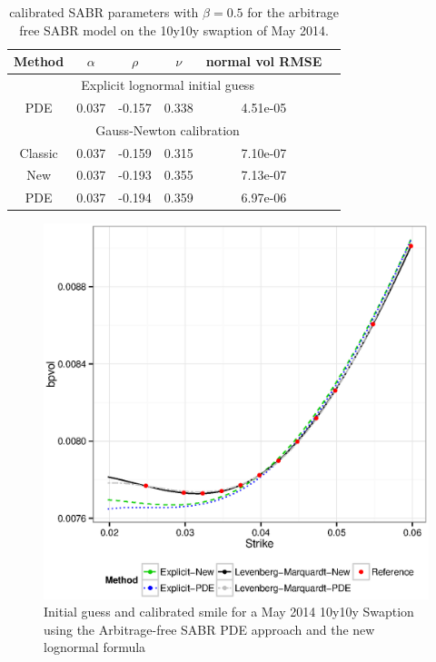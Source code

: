 \documentclass[]{rAMF2e}
\begin{document}
\begin{table}[hbp]
\begin{center}
\caption{\label{tbl:arbfree_sabr_fit}calibrated SABR parameters with $\beta=0.5$ for the arbitrage free SABR model on the 10y10y swaption of May 2014.}
\begin{tabular}{c c c c c c}
\hline
Method & $\alpha$ & $\rho$ &$\nu$ & normal vol RMSE \\
\hline
\multicolumn{5}{c}{Explicit lognormal initial guess}\\
\hline
PDE & 0.037 & -0.157 & 0.338 & 4.51e-05 \\
\hline
\multicolumn{5}{c}{Gauss-Newton calibration}\\
\hline
Classic & 0.037 & -0.159 & 0.315 & 7.10e-07\\
New & 0.037 & -0.193 & 0.355 & 7.13e-07\\
PDE & 0.037 & -0.194 & 0.359 & 6.97e-06\\
\hline
\end{tabular}
\end{center}
\end{table}

\begin{figure}[htbp]
  \caption{\label{fig:lognormal_vs_arbfree_fit_10y10y}Initial guess and calibrated smile for a May 2014 10y10y Swaption using the Arbitrage-free SABR PDE approach and the new lognormal formula }
\begin{center}
 \includegraphics[width=11.5cm]{lognormalab_vs_arbfree_fit_10y10y.eps}
\end{center}
\end{figure}
\end{document}
